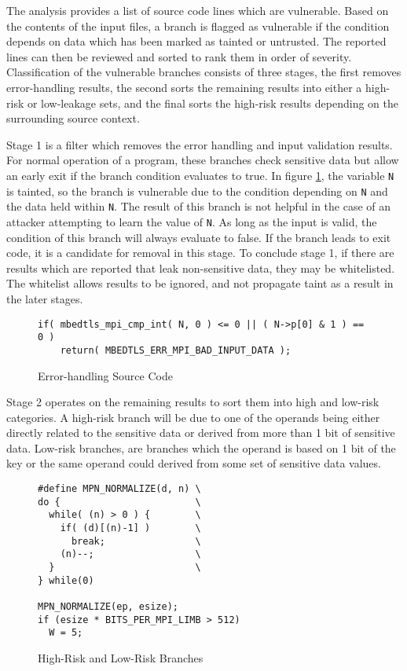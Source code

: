 The analysis provides a list of source code lines which are vulnerable. Based on
the contents of the input files, a branch is flagged as vulnerable if the
condition depends on data which has been marked as tainted or untrusted. The
reported lines can then be reviewed and sorted to rank them in order of
severity. Classification of the vulnerable branches consists of three stages,
the first removes error-handling results, the second sorts the remaining results
into either a high-risk or low-leakage sets, and the final sorts the high-risk results
depending on the surrounding source context.

Stage 1 is a filter which removes the error handling and input validation
results. For normal operation of a program, these branches check sensitive data
but allow an early exit if the branch condition evaluates to true. In figure
\ref{alg:stage0src}, the variable \texttt{N} is tainted, so the branch is
vulnerable due to the condition depending on \texttt{N} and the data held within
\texttt{N}. The result of this branch is not helpful in the case of an attacker
attempting to learn the value of \texttt{N}. As long as the input is valid, the
condition of this branch will always evaluate to false. If the branch leads to
exit code, it is a candidate for removal in this stage. To conclude stage 1, if
there are results which are reported that leak non-sensitive data, they may be
whitelisted. The whitelist allows results to be ignored, and not propagate taint
as a result in the later stages.

\begin{figure}[h!]
\begin{lstlisting}
if( mbedtls_mpi_cmp_int( N, 0 ) <= 0 || ( N->p[0] & 1 ) == 0 )
    return( MBEDTLS_ERR_MPI_BAD_INPUT_DATA );
\end{lstlisting}
\caption{Error-handling Source Code}
\label{alg:stage0src}
\end{figure}

Stage 2 operates on the remaining results to sort them into high and low-risk
categories. A high-risk branch will be due to one of the operands being either
directly related to the sensitive data or derived from more than 1 bit of
sensitive data. Low-risk branches, are branches which the operand is based on 1
bit of the key or the same operand could derived from some set of sensitive data
values.

\begin{figure}
\begin{lstlisting}
#define MPN_NORMALIZE(d, n) \
do {                        \
  while( (n) > 0 ) {        \
    if( (d)[(n)-1] )        \
      break;                \
    (n)--;                  \
  }                         \
} while(0)

MPN_NORMALIZE(ep, esize);
if (esize * BITS_PER_MPI_LIMB > 512)
  W = 5;
\end{lstlisting}
\caption{High-Risk and Low-Risk Branches}
\label{alg:branchriskexample}
\end{figure}


